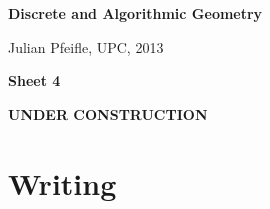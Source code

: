\documentclass[11pt]{amsart}
\begin{document}
\begin{center}
\textbf{\sffamily
   Discrete and Algorithmic Geometry }

\medskip
   Julian Pfeifle,
   UPC, 2013 \mbox{}
\end{center}

\bigskip

\begin{center}
  \textbf{\sffamily Sheet 4}

\bigskip
\textbf{\sffamily UNDER CONSTRUCTION}

\end{center}

\bigskip



\section*{Writing}
\end{document}
